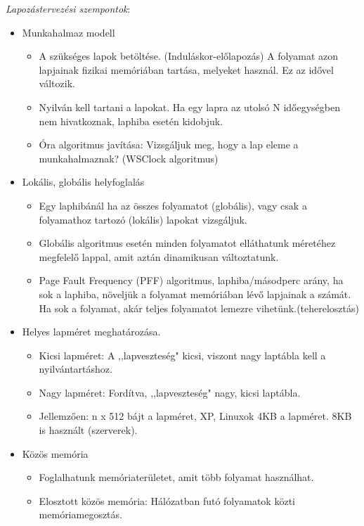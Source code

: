 \documentclass[margin=0px]{article}
\begin{document}
	\textit{Lapozástervezési szempontok}:
	\begin{itemize}
		\item Munkahalmaz modell
		\begin{itemize}
			\item A szükséges lapok betöltése. (Induláskor-előlapozás) A folyamat azon lapjainak fizikai memóriában tartása, melyeket használ. Ez az idővel változik.
			\item Nyilván kell tartani a lapokat. Ha egy lapra az utolsó N időegységben nem hivatkoznak, laphiba esetén kidobjuk.
			\item Óra algoritmus javítása: Vizsgáljuk meg, hogy a lap eleme a munkahalmaznak? (WSClock algoritmus)	
		\end{itemize}
		\item Lokális, globális helyfoglalás
		\begin{itemize}
			\item Egy laphibánál ha az összes folyamatot (globális), vagy csak a folyamathoz tartozó (lokális) lapokat vizsgáljuk.
			\item Globális algoritmus esetén minden folyamatot elláthatunk méretéhez megfelelő lappal, amit aztán dinamikusan változtatunk.
			\item Page Fault Frequency (PFF) algoritmus, laphiba/másodperc arány, ha sok a laphiba, növeljük a folyamat memóriában lévő lapjainak a számát. Ha sok a folyamat, akár teljes folyamatot lemezre vihetünk.(teherelosztás)
		\end{itemize}
		\item Helyes lapméret meghatározása.
		\begin{itemize}
			\item Kicsi lapméret: A ,,lapveszteség" kicsi, viszont nagy laptábla kell a nyilvántartáshoz.
			\item Nagy lapméret: Fordítva, ,,lapveszteség" nagy, kicsi laptábla.
			\item Jellemzően: n x 512 bájt a lapméret, XP, Linuxok 4KB a lapméret. 8KB is használt (szerverek).
		\end{itemize}
		\item Közös memória
		\begin{itemize}
			\item Foglalhatunk memóriaterületet, amit több folyamat használhat.
			\item Elosztott közös memória: Hálózatban futó folyamatok közti memóriamegosztás.
		\end{itemize} 
	\end{itemize}
	
\end{document}

